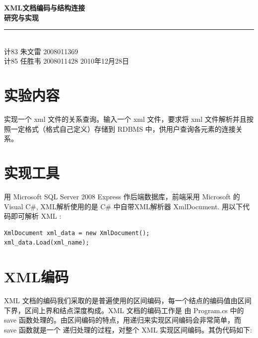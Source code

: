 \documentclass[10pt]{article}
\newcommand{\HRule}{\rule{\linewidth}{0.3mm}}
\begin{document}
\setlength{\parindent}{2em}
\begin{CJK}{UTF8}{gbsn}

\pagestyle{fancy}
\fancyhead{}
\rhead{\thepage}

\setlength{\topmargin}{3cm}
\begin{titlepage}
\begin{center}
{\huge \bfseries XML文档编码与结构连接\\研究与实现}\\
\HRule \\[0.4cm] 
\vspace{2cm}
\vspace{3cm}
{\large 计83{ }朱文雷{ }2008011369\\计85{ }任胜韦{ }2008011428}
\vfill
{\large 2010年12月28日}
\end{center}
\end{titlepage}
\setlength{\topmargin}{0cm}

\newpage
\tableofcontents
\newpage

\section{实验内容}
实现一个 xml 文件的关系查询。输入一个 xml 文件，要求将 xml 文件解析并且按照一定格式（格式自己定义）存储到 RDBMS 中，供用户查询各元素的连接关系。


\section{实现工具}
用 Microsoft SQL Server 2008 Express 作后端数据库，前端采用 Microsoft 的 Visual C\#, XML解析使用的是 C\# 中自带XML解析器 
XmlDocument. 用以下代码即可解析 XML :\\
\begin{verbatim}
XmlDocument xml_data = new XmlDocument();
xml_data.Load(xml_name);
\end{verbatim}

\section{XML编码}
XML 文档的编码我们采取的是普遍使用的区间编码，每一个结点的编码值由区间下界，区间上界和结点深度构成。XML 文档的编码工作是
由 Program.cs 中的 save 函数处理的。由区间编码的特点，用递归来实现区间编码会非常简单，而 save 函数就是一个
递归处理的过程，对整个 XML 实现区间编码。其伪代码如下:\\


\end{CJK}
\end{document}
